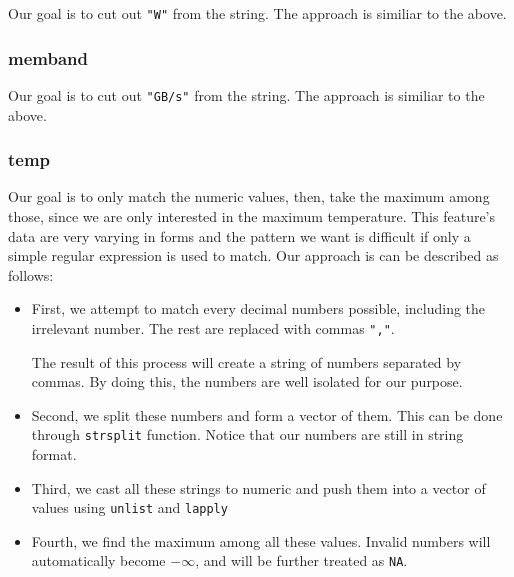 
Our goal is to cut out \verb|"W"| from the string. The approach is similiar to the above.

\subsubsection*{memband}


Our goal is to cut out \verb|"GB/s"| from the string. The approach is similiar to the above.

\subsubsection*{temp}


Our goal is to only match the numeric values, then, take the maximum among those, since we are only interested in the maximum temperature.
This feature's data are very varying in forms and the pattern we want is difficult if only a simple regular expression is used to match.
Our approach is can be described as follows:

\begin{itemize}
    \item First, we attempt to match every decimal numbers possible, including the irrelevant number. The rest are replaced with commas \verb|","|.
    
    The result of this process will create a string of numbers separated by commas. By doing this, the numbers are well isolated for our purpose.

    \item Second, we split these numbers and form a vector of them. This can be done through \texttt{strsplit} function. Notice that our numbers
    are still in string format.

    \item Third, we cast all these strings to numeric and push them into a vector of values using \texttt{unlist} and \texttt{lapply}
    
    \item Fourth, we find the maximum among all these values. Invalid numbers will automatically become \(-\infty\), and will be further treated as \texttt{NA}.

\end{itemize}

